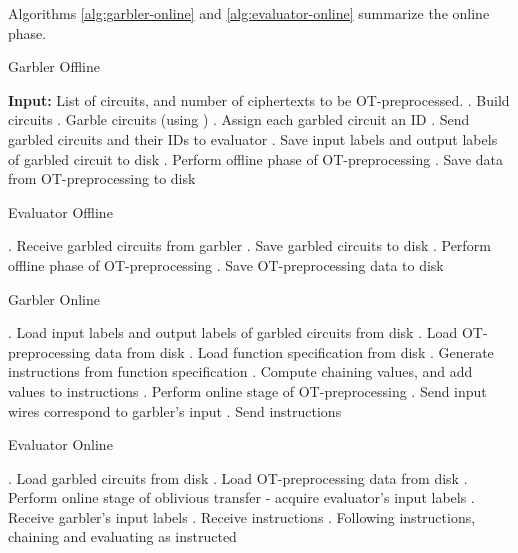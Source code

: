 Algorithms \ref{alg:garbler-online} and \ref{alg:evaluator-online} summarize the online phase. 

\begin{algorithm}
    \caption{Garbler Offline}
    \label{alg:garbler-offline}
    \begin{algorithmic}
        \State \textbf{Input:} List of circuits, and number of ciphertexts to be OT-preprocessed.
        . Build circuits
        . Garble circuits (using \LibGarble)
        . Assign each garbled circuit an ID
        . Send garbled circuits and their IDs to evaluator
        . Save input labels and output labels of garbled circuit to disk
        . Perform offline phase of OT-preprocessing
        . Save data from OT-preprocessing to disk
    \end{algorithmic}
\end{algorithm}

\begin{algorithm}
    \caption{Evaluator Offline}
    \label{alg:evaluator-offline}
    \begin{algorithmic}
        . Receive garbled circuits from garbler
        . Save garbled circuits to disk
        . Perform offline phase of OT-preprocessing
        . Save OT-preprocessing data to disk
    \end{algorithmic}
\end{algorithm}

\begin{algorithm}
    \caption{Garbler Online}
    \label{alg:garbler-online}
    \begin{algorithmic}
        . Load input labels and output labels of garbled circuits from disk
        . Load OT-preprocessing data from disk
        . Load function specification from disk
        . Generate instructions from function specification
        . Compute chaining values, and add values to instructions
        . Perform online stage of OT-preprocessing
        . Send input wires correspond to garbler's input
        . Send instructions
    \end{algorithmic}
\end{algorithm}

\begin{algorithm}
    \caption{Evaluator Online}
    \label{alg:evaluator-online}
    \begin{algorithmic}
        . Load garbled circuits from disk
        . Load OT-preprocessing data from disk
        . Perform online stage of oblivious transfer - acquire evaluator's input labels
        . Receive garbler's input labels
        . Receive instructions
        . Following instructions, chaining and evaluating as instructed
    \end{algorithmic}
\end{algorithm}


